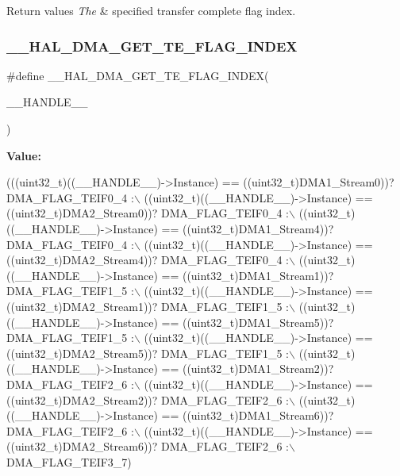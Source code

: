 \begin{DoxyRetVals}{Return values}
{\em The} & specified transfer complete flag index. \\
\hline
\end{DoxyRetVals}
\mbox{\label{group___d_m_a_ga5e765bb3b1c5fc9f1b1abbbb764250bc}} 
\subsubsection{\texorpdfstring{\+\_\+\+\_\+\+H\+A\+L\+\_\+\+D\+M\+A\+\_\+\+G\+E\+T\+\_\+\+T\+E\+\_\+\+F\+L\+A\+G\+\_\+\+I\+N\+D\+EX}{\_\_HAL\_DMA\_GET\_TE\_FLAG\_INDEX}}
{\footnotesize\ttfamily \#define \+\_\+\+\_\+\+H\+A\+L\+\_\+\+D\+M\+A\+\_\+\+G\+E\+T\+\_\+\+T\+E\+\_\+\+F\+L\+A\+G\+\_\+\+I\+N\+D\+EX(\begin{DoxyParamCaption}\item[{}]{\+\_\+\+\_\+\+H\+A\+N\+D\+L\+E\+\_\+\+\_\+ }\end{DoxyParamCaption})}

{\bfseries Value\+:}
\begin{DoxyCode}
(((uint32\_t)((\_\_HANDLE\_\_)->Instance) == ((uint32\_t)DMA1\_Stream0))? DMA\_FLAG\_TEIF0\_4 :\(\backslash\)
 ((uint32\_t)((\_\_HANDLE\_\_)->Instance) == ((uint32\_t)DMA2\_Stream0))? DMA\_FLAG\_TEIF0\_4 :\(\backslash\)
 ((uint32\_t)((\_\_HANDLE\_\_)->Instance) == ((uint32\_t)DMA1\_Stream4))? DMA\_FLAG\_TEIF0\_4 :\(\backslash\)
 ((uint32\_t)((\_\_HANDLE\_\_)->Instance) == ((uint32\_t)DMA2\_Stream4))? DMA\_FLAG\_TEIF0\_4 :\(\backslash\)
 ((uint32\_t)((\_\_HANDLE\_\_)->Instance) == ((uint32\_t)DMA1\_Stream1))? DMA\_FLAG\_TEIF1\_5 :\(\backslash\)
 ((uint32\_t)((\_\_HANDLE\_\_)->Instance) == ((uint32\_t)DMA2\_Stream1))? DMA\_FLAG\_TEIF1\_5 :\(\backslash\)
 ((uint32\_t)((\_\_HANDLE\_\_)->Instance) == ((uint32\_t)DMA1\_Stream5))? DMA\_FLAG\_TEIF1\_5 :\(\backslash\)
 ((uint32\_t)((\_\_HANDLE\_\_)->Instance) == ((uint32\_t)DMA2\_Stream5))? DMA\_FLAG\_TEIF1\_5 :\(\backslash\)
 ((uint32\_t)((\_\_HANDLE\_\_)->Instance) == ((uint32\_t)DMA1\_Stream2))? DMA\_FLAG\_TEIF2\_6 :\(\backslash\)
 ((uint32\_t)((\_\_HANDLE\_\_)->Instance) == ((uint32\_t)DMA2\_Stream2))? DMA\_FLAG\_TEIF2\_6 :\(\backslash\)
 ((uint32\_t)((\_\_HANDLE\_\_)->Instance) == ((uint32\_t)DMA1\_Stream6))? DMA\_FLAG\_TEIF2\_6 :\(\backslash\)
 ((uint32\_t)((\_\_HANDLE\_\_)->Instance) == ((uint32\_t)DMA2\_Stream6))? DMA\_FLAG\_TEIF2\_6 :\(\backslash\)
   DMA\_FLAG\_TEIF3\_7)
\end{DoxyCode}


